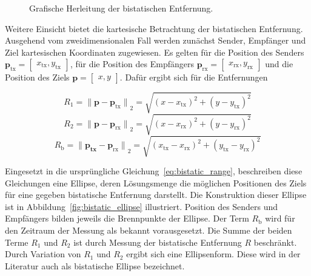 \begin{figure}[htb]
{
    }
    \caption{Grafische Herleitung der bistatischen Entfernung.}\label{fig:bistatic_range}
\end{figure}

Weitere Einsicht bietet die kartesische Betrachtung der bistatischen Entfernung. Ausgehend vom zweidimensionalen Fall werden zunächst Sender, Empfänger und Ziel kartesischen Koordinaten zugewiesen. Es gelten für die Position des Senders \(\boldsymbol{p}_\text{tx} = \begin{bmatrix} x_\text{tx}, y_\text{tx} \end{bmatrix}\), für die Position des Empfängers \(\boldsymbol{p}_\text{rx} = \begin{bmatrix} x_\text{rx}, y_\text{rx} \end{bmatrix}\) und die Position des Ziels \(\boldsymbol{p} = \begin{bmatrix} x, y \end{bmatrix}\). Dafür ergibt sich für die Entfernungen

\begin{equation}
    R_1 = {\lVert \boldsymbol{p} - \boldsymbol{p}_\text{tx} \rVert}_2 = \sqrt{{(x - x_\text{tx})}^2 + {(y - y_\text{tx})}^2}
\end{equation}
\begin{equation}
    R_2 = {\lVert \boldsymbol{p} - \boldsymbol{p}_\text{rx} \rVert}_2 = \sqrt{{(x - x_\text{rx})}^2 + {(y - y_\text{rx})}^2}
\end{equation}
\begin{equation}
    R_\text{b} = {\lVert \boldsymbol{p_\text{tx}} - \boldsymbol{p}_\text{rx} \rVert}_2 = \sqrt{{(x_\text{tx} - x_\text{rx})}^2 + {(y_\text{tx} - y_\text{rx})}^2}
\end{equation}

Eingesetzt in die ursprüngliche Gleichung~\ref{eq:bistatic_range}, beschreiben diese Gleichungen eine Ellipse, deren Lösungsmenge die möglichen Positionen des Ziels für eine gegeben bistatische Entfernung darstellt. Die Konstruktion dieser Ellipse ist in Abbildung~\ref{fig:bistatic_ellipse} illustriert. Position des Senders und Empfängers bilden jeweils die Brennpunkte der Ellipse. Der Term \(R_\text{b}\) wird für den Zeitraum der Messung als bekannt vorausgesetzt. Die Summe der beiden Terme \(R_1\) und \(R_2\) ist durch Messung der bistatische Entfernung \(R\) beschränkt. Durch Variation von \(R_1\) und \(R_2\) ergibt sich eine Ellipsenform. Diese wird in der Literatur auch als bistatische Ellipse bezeichnet.

